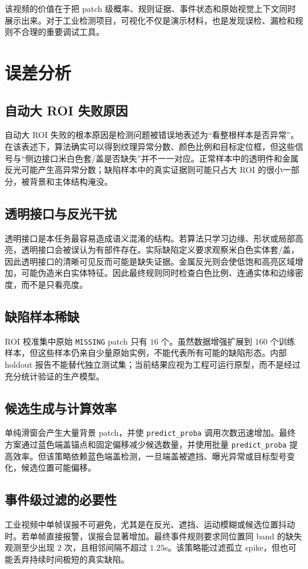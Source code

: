 \documentclass[a4paper,12pt]{article}
\newcommand{\code}[1]{\texttt{#1}}
\begin{document}
该视频的价值在于把 patch 级概率、规则证据、事件状态和原始视觉上下文同时展示出来。对于工业检测项目，可视化不仅是演示材料，也是发现误检、漏检和规则不合理的重要调试工具。

\section{误差分析}
\subsection{自动大 ROI 失败原因}
自动大 ROI 失败的根本原因是检测问题被错误地表述为“看整根样本是否异常”。在该表述下，算法确实可以得到纹理异常分数、颜色比例和目标定位框，但这些信号与“侧边接口米白色套/盖是否缺失”并不一一对应。正常样本中的透明件和金属反光可能产生高异常分数；缺陷样本中的真实证据则可能只占大 ROI 的很小一部分，被背景和主体结构淹没。

\subsection{透明接口与反光干扰}
透明接口是本任务最容易造成语义混淆的结构。若算法只学习边缘、形状或局部高亮，透明接口会被误认为有部件存在。实际缺陷定义要求观察米白色实体套/盖，因此透明接口的清晰可见反而可能是缺失证据。金属反光则会使低饱和高亮区域增加，可能伪造米白实体特征。因此最终规则同时检查白色比例、连通实体和边缘密度，而不是只看亮度。

\subsection{缺陷样本稀缺}
ROI 校准集中原始 \code{MISSING} patch 只有 $16$ 个。虽然数据增强扩展到 $160$ 个训练样本，但这些样本仍来自少量原始实例，不能代表所有可能的缺陷形态。内部 holdout 报告不能替代独立测试集；当前结果应视为工程可运行原型，而不是经过充分统计验证的生产模型。

\subsection{候选生成与计算效率}
单纯滑窗会产生大量背景 patch，并使 \code{predict\_proba} 调用次数迅速增加。最终方案通过蓝色端盖锚点和固定偏移减少候选数量，并使用批量 \code{predict\_proba} 提高效率。但该策略依赖蓝色端盖检测，一旦端盖被遮挡、曝光异常或目标型号变化，候选位置可能偏移。

\subsection{事件级过滤的必要性}
工业视频中单帧误报不可避免，尤其是在反光、遮挡、运动模糊或候选位置抖动时。若单帧直接报警，误报会显著增加。最终事件规则要求同位置同 band 的缺失观测至少出现 $2$ 次，且相邻间隔不超过 $1.25$s。该策略能过滤孤立 spike，但也可能丢弃持续时间极短的真实缺陷。
\end{document}
